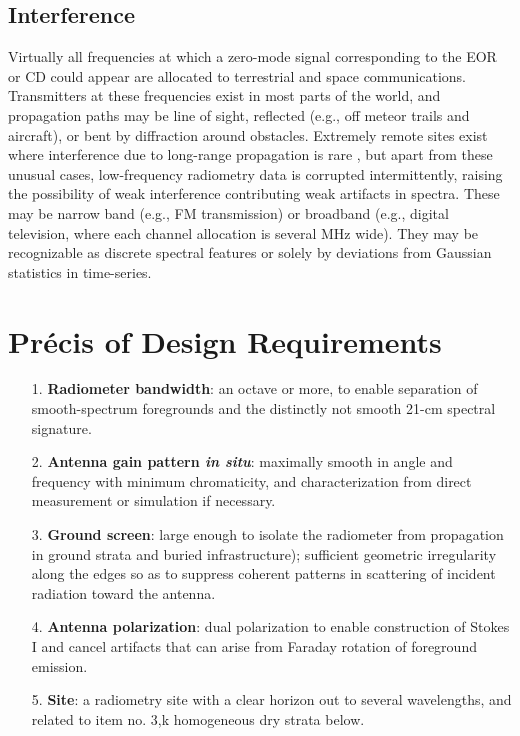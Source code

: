 \subsection{Interference}

Virtually all frequencies at which a zero-mode signal corresponding to the EOR or CD could appear are allocated to terrestrial and space communications. Transmitters at these frequencies exist in most parts of the world, and propagation paths may be line of sight, reflected (e.g., off meteor trails and aircraft), or bent by diffraction around obstacles. Extremely remote sites exist where interference due to long-range propagation is rare \cite{voytek14,philip19}, but apart from these unusual cases, low-frequency radiometry data is corrupted intermittently, raising the possibility of weak interference contributing weak artifacts in spectra.  These may be narrow band (e.g., FM transmission) or broadband (e.g., digital television, where each channel allocation is several MHz wide).  They may be recognizable as discrete spectral features or solely by deviations from Gaussian statistics in time-series.


\section{Pr\'ecis of Design Requirements}


\begin{itemize}
    \item[1.]
    {\bf Radiometer bandwidth}: an octave or more, to enable separation of smooth-spectrum foregrounds and the distinctly not smooth 21-cm spectral signature.
    
    \item[2.]
    {\bf Antenna gain pattern {\it in situ}}: maximally smooth in angle and frequency with minimum chromaticity, and characterization from direct measurement or simulation if necessary.
    
    \item[3.]
    {\bf Ground screen}: large enough to isolate the radiometer from propagation in ground strata and buried infrastructure); sufficient geometric irregularity along the edges so as to suppress coherent patterns in scattering of incident radiation toward the antenna. 
    
    \item[4.]
    {\bf Antenna polarization}: dual polarization to enable construction of Stokes I and cancel artifacts that can arise from Faraday rotation of foreground emission.
    
    \item[5.]
    {\bf Site}:  a radiometry site with a clear horizon out to several wavelengths, and related to item no. 3,k homogeneous dry strata below.

\end{itemize}



